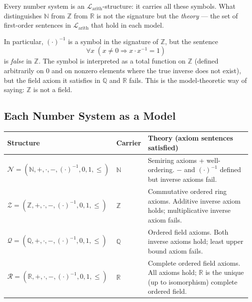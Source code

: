 \begin{remark}
Every number system is an $\mathcal{L}_{\mathrm{arith}}$-structure:
it carries all these symbols.
What distinguishes $\mathbb{N}$ from $\mathbb{Z}$ from $\mathbb{R}$
is not the signature but the \emph{theory} --- the set of first-order
sentences in $\mathcal{L}_{\mathrm{arith}}$ that hold in each model.

In particular, $(\cdot)^{-1}$ is a symbol in the signature of
$\mathbb{Z}$, but the sentence
\[
\forall x\;(x \neq 0 \Rightarrow x \cdot x^{-1} = 1)
\]
is \emph{false} in $\mathbb{Z}$.
The symbol is interpreted as a total function on $\mathbb{Z}$
(defined arbitrarily on $0$ and on nonzero elements where the true
inverse does not exist), but the field axiom it satisfies in
$\mathbb{Q}$ and $\mathbb{R}$ fails.
This is the model-theoretic way of saying: $\mathbb{Z}$ is not a field.
\end{remark}

\subsection*{Each Number System as a Model}

\begin{tcolorbox}[colback=gray!6, colframe=gray!40, arc=2pt,
  left=6pt, right=6pt, top=4pt, bottom=4pt,
  title={\small\textbf{Number Systems as Models of
         $\mathcal{L}_{\mathrm{arith}}$}},
  fonttitle=\small\bfseries]
\small
\renewcommand{\arraystretch}{1.35}
\begin{tabular}{@{} l l l @{}}
\toprule
\textbf{Structure} & \textbf{Carrier} & \textbf{Theory (axiom sentences satisfied)} \\
\midrule
$\mathcal{N} = (\mathbb{N}, +, \cdot, -, (\cdot)^{-1}, 0, 1, \leq)$
  & $\mathbb{N}$
  & Semiring axioms + well-ordering.
    $-$ and $(\cdot)^{-1}$ defined but inverse axioms fail. \\[4pt]
$\mathcal{Z} = (\mathbb{Z}, +, \cdot, -, (\cdot)^{-1}, 0, 1, \leq)$
  & $\mathbb{Z}$
  & Commutative ordered ring axioms.
    Additive inverse axiom holds; multiplicative inverse axiom fails. \\[4pt]
$\mathcal{Q} = (\mathbb{Q}, +, \cdot, -, (\cdot)^{-1}, 0, 1, \leq)$
  & $\mathbb{Q}$
  & Ordered field axioms.
    Both inverse axioms hold; least upper bound axiom fails. \\[4pt]
$\mathcal{R} = (\mathbb{R}, +, \cdot, -, (\cdot)^{-1}, 0, 1, \leq)$
  & $\mathbb{R}$
  & Complete ordered field axioms.
    All axioms hold; $\mathbb{R}$ is the unique (up to isomorphism)
    complete ordered field. \\
\bottomrule
\end{tabular}
\end{tcolorbox}

